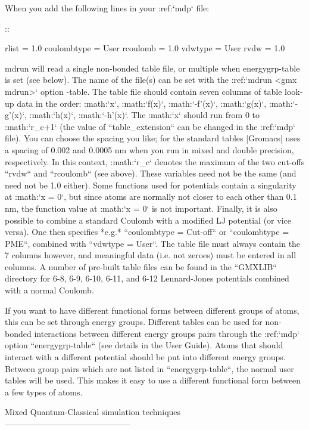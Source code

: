 When you add the following lines in your :ref:`mdp` file:

::

    rlist           = 1.0
    coulombtype     = User
    rcoulomb        = 1.0
    vdwtype         = User
    rvdw            = 1.0

mdrun will read a single non-bonded table file, or multiple when
energygrp-table is set (see below). The name of the file(s) can be set
with the :ref:`mdrun <gmx mdrun>` option -table. The table file should contain seven
columns of table look-up data in the order: :math:`x`, :math:`f(x)`,
:math:`-f'(x)`, :math:`g(x)`, :math:`-g'(x)`, :math:`h(x)`,
:math:`-h'(x)`. The :math:`x` should run from 0 to :math:`r_c+1` (the
value of ``table_extension`` can be changed in the :ref:`mdp` file). You can
choose the spacing you like; for the standard tables |Gromacs| uses a
spacing of 0.002 and 0.0005 nm when you run in mixed and double
precision, respectively. In this context, :math:`r_c` denotes the
maximum of the two cut-offs ``rvdw`` and ``rcoulomb`` (see above). These
variables need not be the same (and need not be 1.0 either). Some
functions used for potentials contain a singularity at :math:`x = 0`,
but since atoms are normally not closer to each other than 0.1 nm, the
function value at :math:`x = 0` is not important. Finally, it is also
possible to combine a standard Coulomb with a modified LJ potential (or
vice versa). One then specifies *e.g.* ``coulombtype = Cut-off`` or
``coulombtype = PME``, combined with ``vdwtype = User``. The table file must
always contain the 7 columns however, and meaningful data (i.e. not
zeroes) must be entered in all columns. A number of pre-built table
files can be found in the ``GMXLIB`` directory for 6-8, 6-9, 6-10, 6-11, and
6-12 Lennard-Jones potentials combined with a normal Coulomb.

If you want to have different functional forms between different groups
of atoms, this can be set through energy groups. Different tables can be
used for non-bonded interactions between different energy groups pairs
through the :ref:`mdp` option ``energygrp-table`` (see details in the User Guide).
Atoms that should interact with a different potential should be put into
different energy groups. Between group pairs which are not listed in
``energygrp-table``, the normal user tables will be used. This makes it easy
to use a different functional form between a few types of atoms.

Mixed Quantum-Classical simulation techniques
---------------------------------------------

